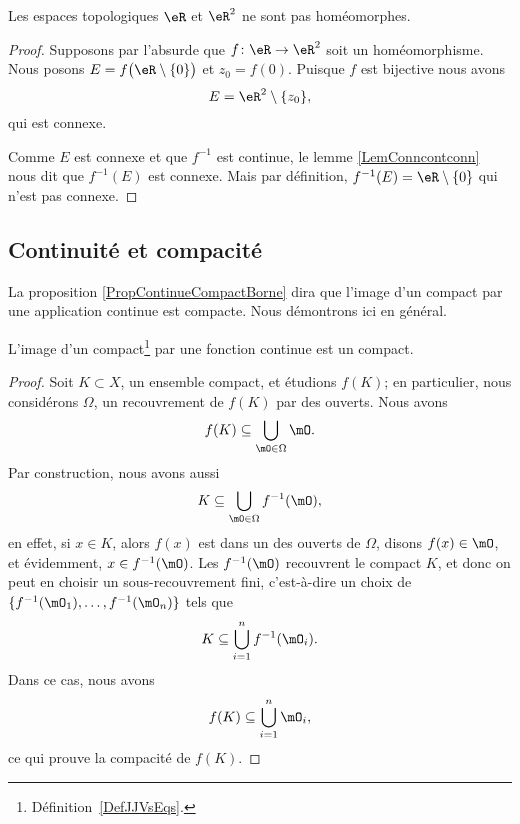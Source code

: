 \begin{example}
	Les espaces topologiques \( \eR\) et \( \eR^2\) ne sont pas homéomorphes.
\end{example}

\begin{proof}
	Supposons par l'absurde que \( f\colon \eR\to \eR^2\) soit un  homéomorphisme. Nous posons \( E=f\big( \eR\setminus\{ 0 \} \big)\) et \( z_0=f(0)\). Puisque \( f\) est bijective nous avons
	\begin{equation}
		E=\eR^2\setminus\{ z_0 \},
	\end{equation}
	qui est connexe.

	Comme \( E\) est connexe et que \( f^{-1}\) est continue, le lemme \ref{LemConncontconn} nous dit que \( f^{-1}(E)\) est connexe. Mais par définition, \( f^{-1}(E)=\eR\setminus\{ 0 \}\) qui n'est pas connexe.
\end{proof}

\subsection{Continuité et compacité}

La proposition \ref{PropContinueCompactBorne} dira que l'image d'un compact par une application continue est compacte. Nous démontrons ici en général.

\begin{theorem}     \label{ThoImCompCotComp}
	L'image d'un compact\footnote{Définition~\ref{DefJJVsEqs}.} par une fonction continue est un compact.
\end{theorem}

\begin{proof}
	Soit \( K\subset X\), un ensemble compact, et étudions \( f(K)\); en particulier, nous considérons \( \Omega\), un recouvrement de \( f(K)\) par des ouverts. Nous avons
	\begin{equation}
		f(K)\subseteq\bigcup_{\mO\in\Omega}\mO.
	\end{equation}
	Par construction, nous avons aussi
	\begin{equation}
		K\subseteq\bigcup_{\mO\in\Omega}f^{-1}(\mO),
	\end{equation}
	en effet, si \( x\in K\), alors \( f(x)\) est dans un des ouverts de \( \Omega\), disons \( f(x)\in \mO\), et évidemment, \( x\in f^{-1}(\mO)\).  Les \( f^{-1}(\mO)\) recouvrent le compact \( K\), et donc on peut en choisir un sous-recouvrement fini, c'est-à-dire un choix de \( \{ f^{-1}(\mO_1),\ldots,f^{-1}(\mO_n) \}\) tels que
	\begin{equation}
		K\subseteq \bigcup_{i=1}^nf^{-1}(\mO_i).
	\end{equation}
	Dans ce cas, nous avons
	\begin{equation}
		f(K)\subseteq\bigcup_{i=1}^n\mO_i,
	\end{equation}
	ce qui prouve la compacité de \( f(K)\).
\end{proof}

